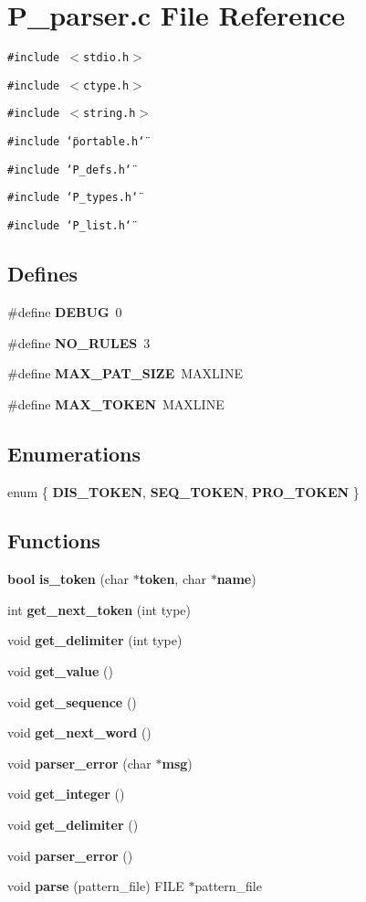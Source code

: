 \section{P\_\-parser.c File Reference}
\label{P__parser_8c}
{\tt \#include $<$stdio.h$>$}\par
{\tt \#include $<$ctype.h$>$}\par
{\tt \#include $<$string.h$>$}\par
{\tt \#include \char`\"{}portable.h\char`\"{}}\par
{\tt \#include \char`\"{}P\_\-defs.h\char`\"{}}\par
{\tt \#include \char`\"{}P\_\-types.h\char`\"{}}\par
{\tt \#include \char`\"{}P\_\-list.h\char`\"{}}\par
\subsection*{Defines}
\begin{CompactItemize}
\item 
\#define {\bf DEBUG}\ 0
\item 
\#define {\bf NO\_\-RULES}\ 3
\item 
\#define {\bf MAX\_\-PAT\_\-SIZE}\ MAXLINE
\item 
\#define {\bf MAX\_\-TOKEN}\ MAXLINE
\end{CompactItemize}
\subsection*{Enumerations}
\begin{CompactItemize}
\item 
enum \{ {\bf DIS\_\-TOKEN}, 
{\bf SEQ\_\-TOKEN}, 
{\bf PRO\_\-TOKEN}
 \}
\end{CompactItemize}
\subsection*{Functions}
\begin{CompactItemize}
\item 
{\bf bool} {\bf is\_\-token} (char $\ast${\bf token}, char $\ast${\bf name})
\item 
int {\bf get\_\-next\_\-token} (int type)
\item 
void {\bf get\_\-delimiter} (int type)
\item 
void {\bf get\_\-value} ()
\item 
void {\bf get\_\-sequence} ()
\item 
void {\bf get\_\-next\_\-word} ()
\item 
void {\bf parser\_\-error} (char $\ast${\bf msg})
\item 
void {\bf get\_\-integer} ()
\item 
void {\bf get\_\-delimiter} ()
\item 
void {\bf parser\_\-error} ()
\item 
void {\bf parse} (pattern\_\-file) FILE $\ast$pattern\_\-file
\end{CompactItemize}
